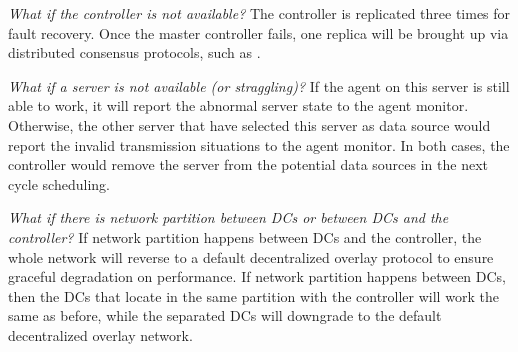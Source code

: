 \begin{packedenumerate}
\item \emph{What if the controller is not available?} The controller is replicated three times for fault recovery. Once the master controller fails, one replica will be brought up via distributed consensus protocols, such as \cite{lamport1998part}.
\item \emph{What if a server is not available (or straggling)?} If the agent on this server is still able to work, it will report the abnormal server state to the agent monitor. Otherwise, the other server that have selected this server as data source would report the invalid transmission situations to the agent monitor. In both cases, the controller would remove the server from the potential data sources in the next cycle scheduling.
\item \emph{What if there is network partition between DCs or between DCs and the controller?} If network partition happens between DCs and the controller, the whole network will reverse to a default decentralized overlay protocol to ensure graceful degradation on performance. If network partition happens between DCs, then the DCs that locate in the same partition with the controller will work the same as before, while the separated DCs will downgrade to the default decentralized overlay network.
\end{packedenumerate}
%
%
%
%
%



